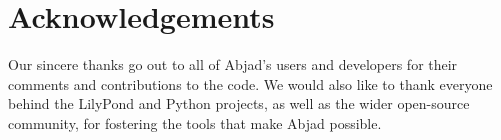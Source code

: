 \documentclass{article}
\begin{document}
\section{Acknowledgements} \label{sec:acknowledgements}

Our sincere thanks go out to all of Abjad's users and developers for their
comments and contributions to the code. We would also like to thank everyone
behind the LilyPond and Python projects, as well as the wider open-source
community, for fostering the tools that make Abjad possible.


\end{document}
